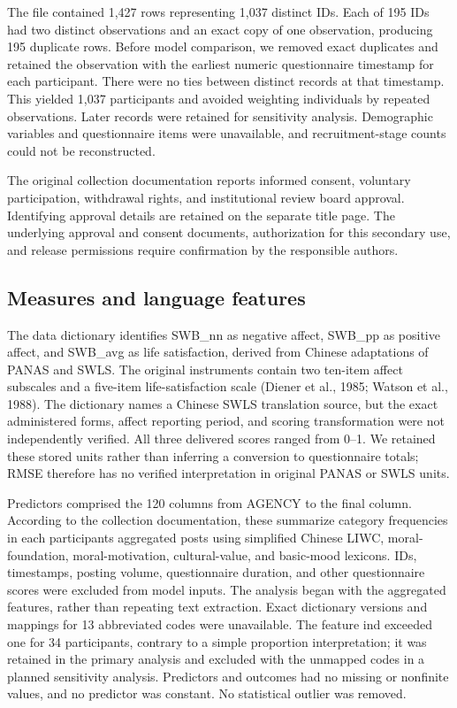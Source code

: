 \documentclass[11pt,letterpaper]{article}
\begin{document}
The file contained 1,427 rows representing 1,037 distinct IDs. Each of 195 IDs had two distinct observations and an exact copy of one observation, producing 195 duplicate rows. Before model comparison, we removed exact duplicates and retained the observation with the earliest numeric questionnaire timestamp for each participant. There were no ties between distinct records at that timestamp. This yielded 1,037 participants and avoided weighting individuals by repeated observations. Later records were retained for sensitivity analysis. Demographic variables and questionnaire items were unavailable, and recruitment-stage counts could not be reconstructed.

The original collection documentation reports informed consent, voluntary participation, withdrawal rights, and institutional review board approval. Identifying approval details are retained on the separate title page. The underlying approval and consent documents, authorization for this secondary use, and release permissions require confirmation by the responsible authors.

\subsection{Measures and language features}\label{measures-and-language-features}

The data dictionary identifies SWB\_\allowbreak{}nn as negative affect, SWB\_\allowbreak{}pp as positive affect, and SWB\_\allowbreak{}avg as life satisfaction, derived from Chinese adaptations of PANAS and SWLS. The original instruments contain two ten-item affect subscales and a five-item life-satisfaction scale (Diener et al., 1985; Watson et al., 1988). The dictionary names a Chinese SWLS translation source, but the exact administered forms, affect reporting period, and scoring transformation were not independently verified. All three delivered scores ranged from 0--1. We retained these stored units rather than inferring a conversion to questionnaire totals; RMSE therefore has no verified interpretation in original PANAS or SWLS units.

Predictors comprised the 120 columns from AGENCY to the final column. According to the collection documentation, these summarize category frequencies in each participant\textquotesingle s aggregated posts using simplified Chinese LIWC, moral-foundation, moral-motivation, cultural-value, and basic-mood lexicons. IDs, timestamps, posting volume, questionnaire duration, and other questionnaire scores were excluded from model inputs. The analysis began with the aggregated features, rather than repeating text extraction. Exact dictionary versions and mappings for 13 abbreviated codes were unavailable. The feature ind exceeded one for 34 participants, contrary to a simple proportion interpretation; it was retained in the primary analysis and excluded with the unmapped codes in a planned sensitivity analysis. Predictors and outcomes had no missing or nonfinite values, and no predictor was constant. No statistical outlier was removed.
\end{document}
